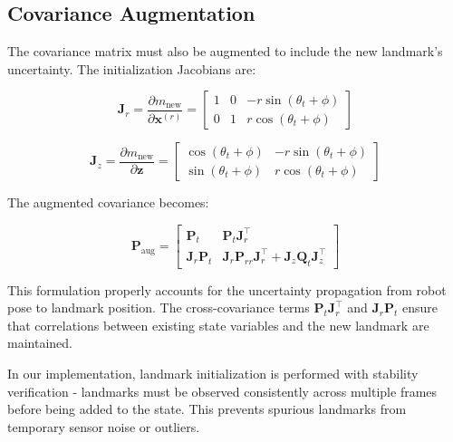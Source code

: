 \documentclass[12pt,a4paper]{article}
\newcommand{\state}{\bm{x}}
\newcommand{\measurement}{\bm{z}}
\newcommand{\covariance}{\bm{P}}
\newcommand{\noise}{\bm{Q}}
\begin{document}
\subsection{Covariance Augmentation}

The covariance matrix must also be augmented to include the new landmark's uncertainty. The initialization Jacobians are:

\begin{equation}
    \bm{J}_r = \frac{\partial m_{\text{new}}}{\partial \state^{(r)}} = \begin{bmatrix}
        1 & 0 & -r \sin(\theta_t + \phi) \\
        0 & 1 & r \cos(\theta_t + \phi)
    \end{bmatrix}
\end{equation}

\begin{equation}
    \bm{J}_z = \frac{\partial m_{\text{new}}}{\partial \measurement} = \begin{bmatrix}
        \cos(\theta_t + \phi) & -r \sin(\theta_t + \phi) \\
        \sin(\theta_t + \phi) & r \cos(\theta_t + \phi)
    \end{bmatrix}
\end{equation}

The augmented covariance becomes:

\begin{equation}
    \covariance_{\text{aug}} = \begin{bmatrix}
        \covariance_t & \covariance_t \bm{J}_r^\top \\
        \bm{J}_r \covariance_t & \bm{J}_r \covariance_{rr} \bm{J}_r^\top + \bm{J}_z \noise_t \bm{J}_z^\top
    \end{bmatrix}
\end{equation}

This formulation properly accounts for the uncertainty propagation from robot pose to landmark position. The cross-covariance terms $\covariance_t \bm{J}_r^\top$ and $\bm{J}_r \covariance_t$ ensure that correlations between existing state variables and the new landmark are maintained.

In our implementation, landmark initialization is performed with stability verification - landmarks must be observed consistently across multiple frames before being added to the state. This prevents spurious landmarks from temporary sensor noise or outliers.

\end{document}
